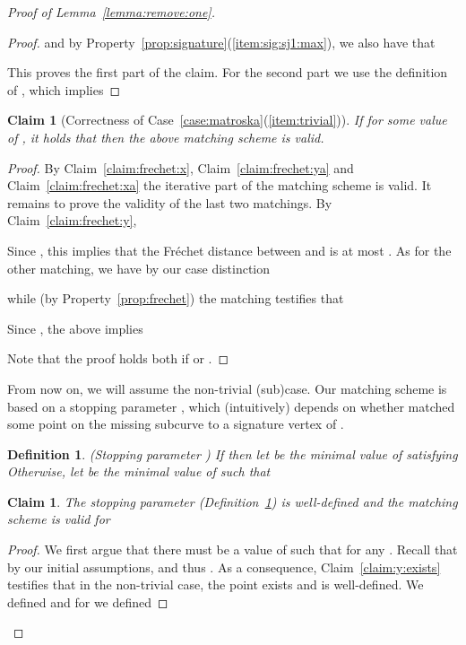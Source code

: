\documentclass[11pt, letter]{article}
\newtheorem{definition}[theorem]{Definition}
\newtheorem{claim}[theorem]{Claim}
\newcommand{\lemref}[1]{Lemma~\ref{lemma:#1}}
\newcommand{\deflab}[1]{\label{def:#1}}
\newcommand{\defref}[1]{Definition~\ref{def:#1}}
\newcommand{\caseref}[1]{Case~\ref{case:#1}}
\newcommand{\claimlab}[1]{\label{claim:#1}}
\newcommand{\claimref}[1]{Claim~\ref{claim:#1}}
\newcommand{\propref}[1]{Property~\ref{prop:#1}}
\newcommand{\Frechet}{Fr\'echet\xspace}
\begin{document}
\begin{proof}[Proof of \lemref{remove:one}]
\begin{proof}
and by \propref{signature}(\ref{item:sig:sj1:max}), we also have that

This proves the first part of the claim. For the second part we use the definition of , which implies

\end{proof}



\begin{claim}[Correctness of \caseref{matroska}(\ref{item:trivial})]
If for some value of , it holds that 
 then
the above matching scheme is valid.
\claimlab{trivial:subcase}
\end{claim}

\begin{proof}
By \claimref{frechet:x}, \claimref{frechet:ya} and \claimref{frechet:xa} the
iterative part of the matching scheme is valid.
It remains to prove the validity of the last two matchings.
By \claimref{frechet:y},

Since , this implies that the \Frechet distance
between  and  is at most .
As for the other matching, we have by our case distinction 

while (by \propref{frechet}) the matching  testifies that

Since , the above implies

Note that the proof holds both if  or .
\end{proof}

From now on, we will assume the non-trivial (sub)case.  Our matching scheme is
based on a stopping parameter , which (intuitively) depends on whether
 matched some point on the missing subcurve  to a signature
vertex  of .

\begin{definition}(Stopping parameter )
If  then let  be the minimal value of 
satisfying  
Otherwise, let  be the minimal value of  such that 
\deflab{a:stop}
\end{definition}

\begin{claim}
The stopping parameter  (\defref{a:stop}) is well-defined 
and the matching scheme is valid for  
\end{claim}
\begin{proof}
\newcommand{\Astall}{\widehat{a}}
We first argue that there must be a value of  such that 
 for any .
Recall that by our initial assumptions,  and 
thus . As a consequence, \claimref{y:exists} 
testifies that in the non-trivial case, the point  exists and is well-defined.
We defined  and for  we defined


\end{proof}
\end{proof}
\end{document}
